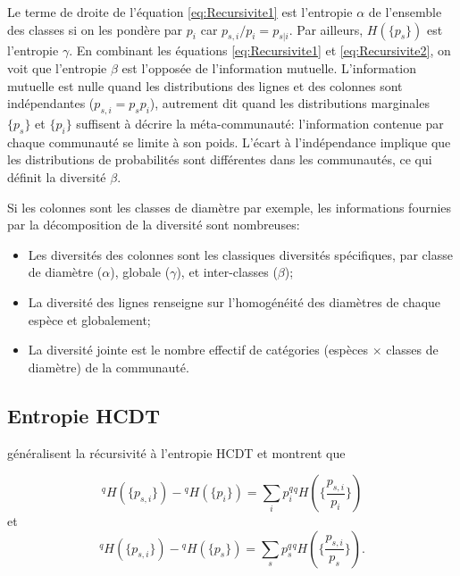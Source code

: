 \documentclass[
  11pt,
  french,
  a4paper,
  extrafontsizes,onecolumn,openright
  ]{memoir}
\providecommand{\tightlist}{%
  \setlength{\itemsep}{0pt}\setlength{\parskip}{0pt}}
\begin{document}
Le terme de droite de l'équation \eqref{eq:Recursivite1} est l'entropie \(\alpha\) de l'ensemble des classes si on les pondère par \(p_i\) car \({p_{s,i}}/{p_i}=p_{s|i}\).
Par ailleurs, \(H(\{p_s\})\) est l'entropie \(\gamma\).
En combinant les équations \eqref{eq:Recursivite1} et \eqref{eq:Recursivite2}, on voit que l'entropie \(\beta\) est l'opposée de l'information mutuelle.
L'information mutuelle est nulle quand les distributions des lignes et des colonnes sont indépendantes (\(p_{s,i}=p_{s}p_{i}\)), autrement dit quand les distributions marginales \(\{p_s\}\) et \(\{p_i\}\) suffisent à décrire la méta-communauté: l'information contenue par chaque communauté se limite à son poids.
L'écart à l'indépendance implique que les distributions de probabilités sont différentes dans les communautés, ce qui définit la diversité \(\beta\).

Si les colonnes sont les classes de diamètre par exemple, les informations fournies par la décomposition de la diversité sont nombreuses:

\begin{itemize}
\tightlist
\item
  Les diversités des colonnes sont les classiques diversités spécifiques, par classe de diamètre (\(\alpha\)), globale (\(\gamma\)), et inter-classes (\(\beta\));
\item
  La diversité des lignes renseigne sur l'homogénéité des diamètres de chaque espèce et globalement;
\item
  La diversité jointe est le nombre effectif de catégories (espèces \(\times\) classes de diamètre) de la communauté.
\end{itemize}

\subsection{Entropie HCDT}\label{sec-jointeHCDT}

\textcite{Baez2011} généralisent la récursivité à l'entropie HCDT et montrent que

\begin{equation}
  \label{eq:Baez2011a}
  ^{q}\!H\left(\{p_{s,i}\}\right) - {^{q}\!H}\left(\{p_i\}\right) 
  = \sum_i{{p_i^q} {^{q}\!H}\left(\{\frac{p_{s,i}}{p_i}\}\right)}
\end{equation}
et
\begin{equation}
  \label{eq:Baez2011b}
  ^{q}\!H\left(\{p_{s,i}\}\right) - {^{q}\!H}\left(\{p_s\}\right) 
  = \sum_s{{p_s^q} {^{q}\!H}\left(\{\frac{p_{s,i}}{p_s}\}\right)}.
\end{equation}
\end{document}
